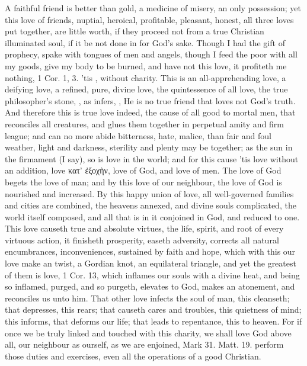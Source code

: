 {A faithful friend is better than gold, a medicine of
misery, an only possession; yet this love of friends, nuptial,
heroical, profitable, pleasant, honest, all three loves put together,
are little worth, if they proceed not from a true Christian illuminated
soul, if it be not done in  for God's sake. Though I had
the gift of prophecy, spake with tongues of men and angels, though I
feed the poor with all my goods, give my body to be burned, and have
not this love, it profiteth me nothing, 1 Cor.  1, 3. 'tis
, without charity. This is an all-apprehending love,
a deifying love, a refined, pure, divine love, the quintessence of all
love, the true philosopher's stone, , as \Austin{}
infers, , He is no true friend that loves not God's truth. And
therefore this is true love indeed, the cause of all good to mortal
men, that reconciles all creatures, and glues them together in
perpetual amity and firm league; and can no more abide bitterness,
hate, malice, than fair and foul weather, light and darkness, sterility
and plenty may be together; as the sun in the firmament (I say), so is
love in the world; and for this cause 'tis love without an addition,
love \textgreek{κατ' ἐξοχὴν}, love of God, and love of men. The love of God
begets the love of man; and by this love of our neighbour, the love of
God is nourished and increased. By this happy union of love, all
well-governed families and cities are combined, the heavens annexed,
and divine souls complicated, the world itself composed, and all that
is in it conjoined in God, and reduced to one. This love causeth
true and absolute virtues, the life, spirit, and root of every virtuous
action, it finisheth prosperity, easeth adversity, corrects all natural
encumbrances, inconveniences, sustained by faith and hope, which with
this our love make an  twist, a Gordian knot, an
equilateral triangle, and yet the greatest of them is love, 1 Cor.
 13, which inflames our souls with a divine heat, and being
so inflamed, purged, and so purgeth, elevates to God, makes an
atonement, and reconciles us unto him. That other love infects %
the soul of man, this cleanseth; that depresses, this rears; that
causeth cares and troubles, this quietness of mind; this informs, that
deforms our life; that leads to repentance, this to heaven. For if once
we be truly linked and touched with this charity, we shall love God
above all, our neighbour as ourself, as we are enjoined, Mark  31.
Matt.  19. perform those duties and exercises, even all the
operations of a good Christian.

}

